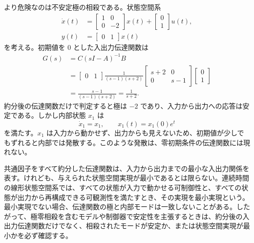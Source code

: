 より危険なのは不安定極の相殺である。状態空間系
\begin{align}
  \dot{x}(t)
  &=
  \begin{bmatrix}
    1 & 0\\
    0 & -2
  \end{bmatrix}x(t)
  +
  \begin{bmatrix}
    0\\
    1
  \end{bmatrix}u(t),\\
  y(t)
  &=
  \begin{bmatrix}
    0 & 1
  \end{bmatrix}x(t)
\end{align}
を考える。初期値を 0 とした入出力伝達関数は
\begin{align}
  G(s)
  &=C(sI-A)^{-1}B\\
  &=
  \begin{bmatrix}0 & 1\end{bmatrix}
  \frac{1}{(s-1)(s+2)}
  \begin{bmatrix}
    s+2 & 0\\
    0 & s-1
  \end{bmatrix}
  \begin{bmatrix}
    0\\
    1
  \end{bmatrix}\\
  &=
  \frac{s-1}{(s-1)(s+2)}
  =
  \frac{1}{s+2}.
  \label{eq:unstable-cancellation}
\end{align}
約分後の伝達関数だけで判定すると極は $-2$ であり、入力から出力への応答は安定である。しかし内部状態 $x_1$ は
\begin{equation}
  \dot{x}_1=x_1,\qquad x_1(t)=x_1(0)e^t
\end{equation}
を満たす。$x_1$ は入力から動かせず、出力からも見えないため、初期値が少しでもずれると内部では発散する。このような発散は、零初期条件の伝達関数には現れない。

\begin{remark}[最小実現と安定性の判定]
共通因子をすべて約分した伝達関数は、入力から出力までの最小な入出力関係を表す。けれども、与えられた状態空間実現が最小であるとは限らない。連続時間の線形状態空間系では、すべての状態が入力で動かせる可制御性と、すべての状態が出力から再構成できる可観測性を満たすとき、その実現を最小実現という。最小実現でない場合、伝達関数の極と内部モードは一致しないことがある。したがって、極零相殺を含むモデルや制御器で安定性を主張するときは、約分後の入出力伝達関数だけでなく、相殺されたモードが安定か、または状態空間実現が最小かを必ず確認する。
\end{remark}

